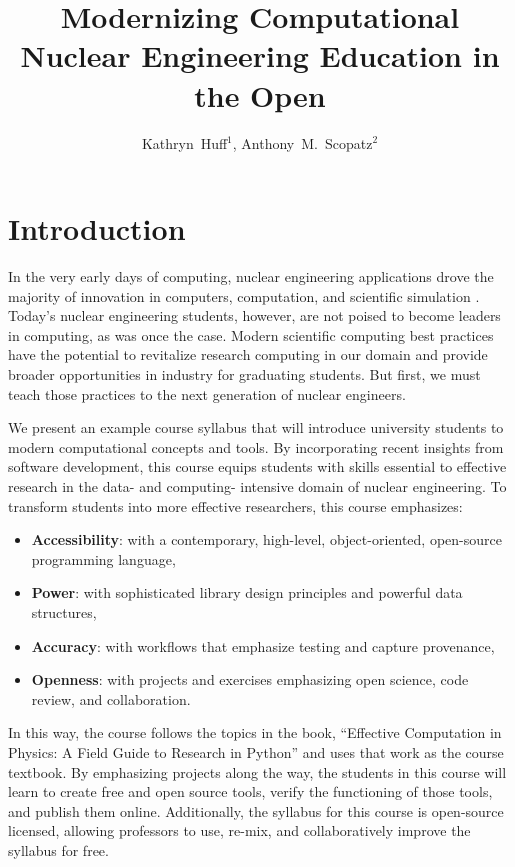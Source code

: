 \documentclass{anstrans}
\title{Modernizing Computational Nuclear Engineering Education in the Open}
\author{Kathryn~Huff$^{1}$, Anthony~M.~Scopatz$^{2}$}
\institute{
$^{1}$ The University of California -- Berkeley, Berkeley, CA 94709 \\
\and $^{2}$ The University of South Carolina, Columbia, SC 29208 \\
}
\begin{document}
\section{Introduction}

In the very early days of computing, nuclear engineering applications drove the
majority of innovation in computers, computation, and scientific simulation
\cite{rhodes_making_2012}. Today's nuclear engineering students, however, are
not poised to become leaders in computing, as was once the case. Modern
scientific computing best practices have the potential to revitalize research
computing in our domain and provide broader opportunities in industry for
graduating students. But first, we must teach those practices to the next
generation of nuclear engineers.

We present an example course syllabus that will introduce university students
to modern computational concepts and tools. By incorporating recent insights
from software development, this course equips students with skills essential
to effective research in the data- and computing- intensive domain of nuclear
engineering.  To transform students into more effective researchers, this
course emphasizes:

\begin{itemize}
\item \textbf{Accessibility}: with a contemporary, high-level, object-oriented, open-source programming language,
\item \textbf{Power}: with sophisticated library design principles and powerful data structures,
\item \textbf{Accuracy}: with workflows that emphasize testing and capture provenance,
\item \textbf{Openness}: with projects and exercises emphasizing open science, code review, and collaboration.
\end{itemize}

In this way, the course follows the topics in the book, ``Effective Computation
in Physics: A Field Guide to Research in Python'' \cite{scopatz_effective_2015}
and uses that work as the course textbook.  By emphasizing projects along the
way, the students in this course will learn to create free and open source
tools, verify the functioning of those tools, and publish them online.
Additionally, the syllabus for this course is open-source licensed, allowing
professors to use, re-mix, and collaboratively improve the syllabus for free.
\end{document}
